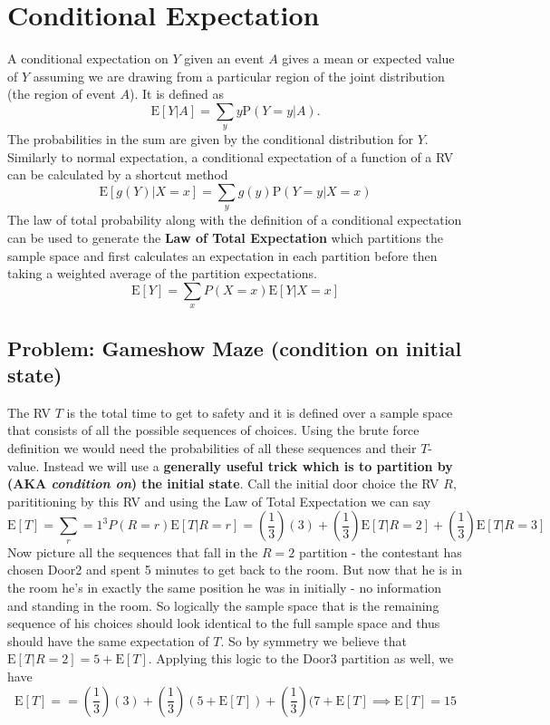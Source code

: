 \section{Conditional Expectation}
A conditional expectation on $Y$ given an event $A$ gives a mean or expected value of $Y$ assuming we are drawing from a particular region of the joint distribution (the region of event $A$). It is defined as
\begin{equation}
\mathrm{E}[Y | A] = \sum_y y\mathrm{P}(Y=y | A).
\end{equation}
The probabilities in the sum are given by the conditional distribution for $Y$. Similarly to normal expectation, a conditional expectation of a function of a RV can be calculated by a shortcut method
\begin{equation}
\mathrm{E}[g(Y) | X=x] = \sum_y g(y)\mathrm{P}(Y=y | X=x)
\end{equation}
The law of total probability along with the definition of a conditional expectation can be used to generate the \textbf{Law of Total Expectation} which partitions the sample space and first calculates an expectation in each partition before then taking a weighted average of the partition expectations.
\begin{equation}
\mathrm{E}[Y] = \sum_xP(X=x)\mathrm{E}[Y | X=x]
\end{equation}



\subsection{Problem: Gameshow Maze (condition on initial state)}
The RV $T$ is the total time to get to safety and it is defined over a sample space that consists of all the possible sequences of choices. Using the brute force definition we would need the probabilities of all these sequences and their $T$-value. Instead we will use a \textbf{generally useful trick which is to partition by (AKA \textit{condition on}) the initial state}. Call the initial door choice the RV $R$, parititioning by this RV and using the Law of Total Expectation we can say
\begin{equation}
\mathrm{E}[T] = \sum_r=1^3 P(R=r)\mathrm{E}[T | R=r] = (\frac{1}{3})(3) + (\frac{1}{3})\mathrm{E}[T | R=2] + (\frac{1}{3})\mathrm{E}[T | R=3]
\end{equation}
Now picture all the sequences that fall in the $R=2$ partition - the contestant has chosen Door2 and spent 5 minutes to get back to the room. But now that he is in the room he's in exactly the same position he was in initially - no information and standing in the room. So logically the sample space that is the remaining sequence of his choices should look identical to the full sample space and thus should have the same expectation of $T$. So by symmetry we believe that $\mathrm{E}[T | R=2] = 5 + \mathrm{E}[T]$. Applying this logic to the Door3 partition as well, we have
\begin{equation}
\mathrm{E}[T] = = (\frac{1}{3})(3) + (\frac{1}{3})(5+\mathrm{E}[T]) + (\frac{1}{3})(7+\mathrm{E}[T] \implies \mathrm{E}[T] = 15
\end{equation}



